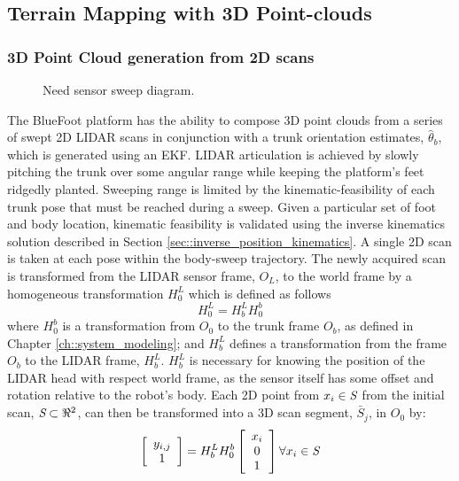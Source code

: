 		\subsection{Terrain Mapping with 3D Point-clouds}
			
			\subsubsection{3D Point Cloud generation from 2D scans}
				\begin{figure}[h!]
					\centering
					\caption{Need sensor sweep diagram.}
					\label{fig::sensor_sweep}
				\end{figure}
				The BlueFoot platform has the ability to compose 3D point clouds from a series of swept 2D LIDAR scans in conjunction with a trunk orientation estimates, $\hat{\theta}_{b}$, which is generated using an EKF. LIDAR articulation is achieved by slowly pitching the trunk over some angular range while keeping the platform's feet ridgedly planted. Sweeping range is limited by the kinematic-feasibility of each trunk pose that must be reached during a sweep. Given a particular set of foot and body location, kinematic feasibility is validated using the inverse kinematics solution described in Section \ref{sec::inverse_position_kinematics}. A single 2D scan is taken at each pose within the body-sweep trajectory. The newly acquired scan is transformed from the LIDAR sensor frame, $O_{L}$, to the world frame by a homogeneous transformation $H^{L}_{0}$ which is defined as follows
					\begin{equation}
						H^{L}_{0} = H^{L}_{b} H^{b}_{0}
						\label{eq::world_to_sensor}
					\end{equation}
				where $H^{b}_{0}$ is a transformation from $O_{0}$ to the trunk frame $O_{b}$, as defined in Chapter \ref{ch::system_modeling}; and $H^{L}_{b}$ defines a transformation from the frame $O_{b}$ to the LIDAR frame, $H^{L}_{b}$. $H^{L}_{b}$ is necessary for knowing the position of the LIDAR head with respect world frame, as the sensor itself has some offset and rotation relative to the robot's body. Each 2D point from $x_{i} \in \emph{S}$ from the initial scan, $\emph{S}\subset \Re^{2}$, can then be transformed into a 3D scan segment, $\bar{S}_{j}$, in $O_{0}$ by:
					\begin{equation}
						\left[
							\begin{array}{c}
								y_{i,j} \\ 1
							\end{array}
						\right]
					 = H^{L}_{b} H^{b}_{0}	
						\left[
							\begin{array}{c}
								x_{i} \\ 0 \\ 1
							\end{array}
						\right] \forall x_{i} \in \emph{S}
						\label{eq::scan_to_segment}
					\end{equation}
